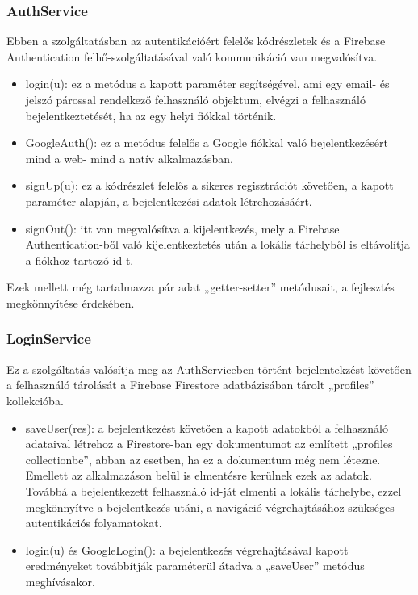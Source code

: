 \documentclass[12pt]{report}
\begin{document}
\subsubsection{AuthService}
Ebben a szolgáltatásban az autentikációért felelős kódrészletek és a Firebase Authentication felhő-szolgáltatásával való kommunikáció van megvalósítva.

\begin{itemize}
	\item login(u): ez a metódus a kapott paraméter segítségével, ami egy email- és jelszó párossal rendelkező felhasználó objektum, elvégzi a felhasználó bejelentkeztetését, ha az egy helyi fiókkal történik.
	\item GoogleAuth(): ez a metódus felelős a Google fiókkal való bejelentkezésért mind a web- mind a natív alkalmazásban.
	\item signUp(u): ez a kódrészlet felelős a sikeres regisztrációt követően, a kapott paraméter alapján, a bejelentkezési adatok létrehozásáért.
	\item signOut(): itt van megvalósítva a kijelentkezés, mely a Firebase Authentication-ből való kijelentkeztetés után a lokális tárhelyből is eltávolítja a fiókhoz tartozó id-t.
\end{itemize}

Ezek mellett még tartalmazza pár adat „getter-setter” metódusait, a fejlesztés megkönnyítése érdekében.

\subsubsection{LoginService}
Ez a szolgáltatás valósítja meg az AuthServiceben történt bejelentekzést követően a felhasználó tárolását a Firebase Firestore adatbázisában tárolt „profiles” kollekcióba.

\begin{itemize}
	\item saveUser(res): a bejelentkezést követően a kapott adatokból a felhasználó adataival létrehoz a Firestore-ban egy dokumentumot az említett „profiles collectionbe”, abban az esetben, ha ez a dokumentum még nem létezne. Emellett az alkalmazáson belül is elmentésre kerülnek ezek az adatok. Továbbá a bejelentkezett felhasználó id-ját elmenti a lokális tárhelybe, ezzel megkönnyítve a bejelentkezés utáni, a navigáció végrehajtásához szükséges autentikációs folyamatokat.
	\item login(u) és GoogleLogin(): a bejelentkezés végrehajtásával kapott eredményeket továbbítják paraméterül átadva a „saveUser” metódus meghívásakor.
\end{itemize}
\end{document}
